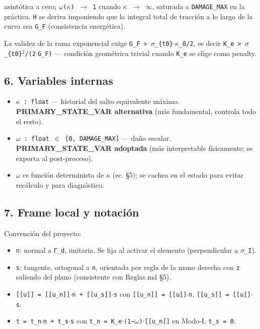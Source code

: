 \documentclass[11pt,letterpaper,oneside]{report}
\begin{document}
asintótica a cero; \texttt{\ensuremath{\omega}(\ensuremath{\kappa}) \ensuremath{\to} 1} cuando \texttt{\ensuremath{\kappa} \ensuremath{\to} \ensuremath{\infty}}, saturada a \texttt{DAMAGE\_MAX} en la práctica. \texttt{H} se deriva imponiendo que la integral total de tracción a lo largo de la curva sea \texttt{G\_F} (consistencia energética).

La validez de la rama exponencial exige \texttt{G\_F > \ensuremath{\sigma}\_\{t0\}\ensuremath{\cdot}\ensuremath{\kappa}\_0/2}, es decir \texttt{K\_e > \ensuremath{\sigma}\_\{t0\}\ensuremath{^{2}}/(2\ensuremath{\cdot}G\_F)} --- condición geométrica trivial cuando \texttt{K\_e} se elige como penalty.

\subsection{6. Variables internas}

\begin{itemize}
  \item \texttt{\ensuremath{\kappa} : float} --- historial del salto equivalente máximo. \textbf{PRIMARY\_STATE\_VAR alternativa} (más fundamental, controla todo el resto).
  \item \texttt{\ensuremath{\omega} : float \ensuremath{\in} [0, DAMAGE\_MAX]} --- daño escalar. \textbf{PRIMARY\_STATE\_VAR adoptada} (más interpretable físicamente; se exporta al post-proceso).
  \item \texttt{\ensuremath{\omega}} es función determinista de \texttt{\ensuremath{\kappa}} (ec. §5); se cachea en el estado para evitar recálculo y para diagnóstico.
\end{itemize}

\subsection{7. Frame local y notación}

Convención del proyecto:

\begin{itemize}
  \item \texttt{n}: normal a \texttt{Γ\_d}, unitaria. Se fija al activar el elemento (perpendicular a \texttt{\ensuremath{\sigma}\_I}).
  \item \texttt{s}: tangente, ortogonal a \texttt{n}, orientada por regla de la mano derecha con \texttt{z} saliendo del plano (consistente con Reglas.md §5).
  \item \texttt{[[u]] = [[u\_n]]\ensuremath{\cdot}n + [[u\_s]]\ensuremath{\cdot}s} con \texttt{[[u\_n]] = [[u]]\ensuremath{\cdot}n}, \texttt{[[u\_s]] = [[u]]\ensuremath{\cdot}s}.
  \item \texttt{t = t\_n\ensuremath{\cdot}n + t\_s\ensuremath{\cdot}s} con \texttt{t\_n = K\_e\ensuremath{\cdot}(1−\ensuremath{\omega})\ensuremath{\cdot}[[u\_n]]} en Modo-I, \texttt{t\_s = 0}.
\end{itemize}
\end{document}

